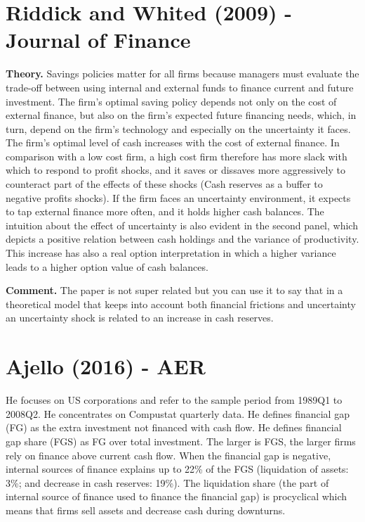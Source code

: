 \documentclass{article}
\begin{document}
{\section{Riddick and Whited (2009) - Journal of Finance}

\textbf{Theory.} Savings policies matter for all firms because managers must evaluate the trade-off between using internal and external funds to finance current and future investment. The firm's optimal saving policy depends not only on the cost of external finance, but also on the firm's expected future financing needs, which, in turn, depend on the firm's technology and especially on the uncertainty it faces. The firm's optimal level of cash increases with the cost of external finance. In comparison with a low cost firm, a high cost firm therefore has more slack with which to respond to profit shocks, and it saves or dissaves more aggressively to counteract part of the effects of these shocks (Cash reserves as a buffer to negative profits shocks). If the firm faces an uncertainty environment, it expects to tap external finance more often, and it holds higher cash balances. The intuition about the effect of uncertainty is also evident in the second panel, which depicts a positive relation between cash holdings and the variance of productivity. This increase has also a real option interpretation in which a higher variance leads to a higher option value of cash balances.

\textbf{Comment.} The paper is not super related but you can use it to say that in a theoretical model that keeps into account both financial frictions and uncertainty an uncertainty shock is related to an increase in cash reserves.


\section{Ajello (2016) - AER}

He focuses on US corporations and refer to the sample period from 1989Q1 to 2008Q2. He concentrates on Compustat quarterly data. He defines financial gap (FG) as the extra investment not financed with cash flow. He defines financial gap share (FGS) as FG over total investment. The larger is FGS, the larger firms rely on finance above current cash flow. When the financial gap is negative, internal sources of finance explains up to 22\% of the FGS (liquidation of assets: 3\%; and decrease in cash reserves: 19\%). The liquidation share (the part of internal source of finance used to finance the financial gap) is procyclical which means that firms sell assets and decrease cash during downturns. 

}
\end{document}
